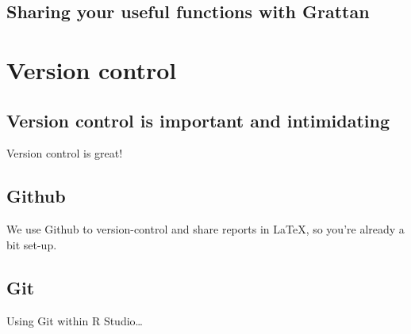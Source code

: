 \documentclass[
]{book}
\begin{document}
\hypertarget{sharing-your-useful-functions-with-grattan}{%
\section{Sharing your useful functions with Grattan}\label{sharing-your-useful-functions-with-grattan}}

\hypertarget{version-control}{%
\chapter{Version control}\label{version-control}}

\hypertarget{version-control-is-important-and-intimidating}{%
\section{Version control is important and intimidating}\label{version-control-is-important-and-intimidating}}

Version control is great!

\hypertarget{github}{%
\section{Github}\label{github}}

We use Github to version-control and share reports in LaTeX, so you're already a bit set-up.

\hypertarget{git}{%
\section{Git}\label{git}}

Using Git within R Studio\ldots{}

  
\end{document}
